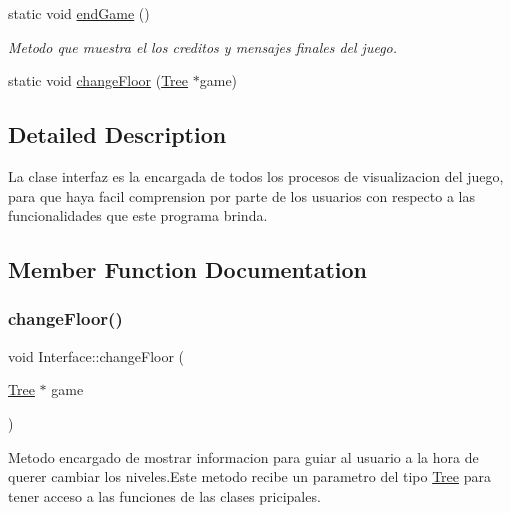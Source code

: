 \begin{DoxyCompactItemize}
\item 
\mbox{\label{class_interface_a242efa2cb3244d2955d5ed12e116f9b5}} 
static void \mbox{\hyperlink{class_interface_a242efa2cb3244d2955d5ed12e116f9b5}{end\+Game}} ()
\begin{DoxyCompactList}\small\item\em Metodo que muestra el los creditos y mensajes finales del juego. \end{DoxyCompactList}\item 
static void \mbox{\hyperlink{class_interface_a2f1cc2f4dbf8df5024708e55bb85c995}{change\+Floor}} (\mbox{\hyperlink{class_tree}{Tree}} $\ast$game)
\end{DoxyCompactItemize}


\subsection{Detailed Description}
La clase interfaz es la encargada de todos los procesos de visualizacion del juego, para que haya facil comprension por parte de los usuarios con respecto a las funcionalidades que este programa brinda. 

\subsection{Member Function Documentation}
\mbox{\label{class_interface_a2f1cc2f4dbf8df5024708e55bb85c995}} 
\subsubsection{\texorpdfstring{change\+Floor()}{changeFloor()}}
{\footnotesize\ttfamily void Interface\+::change\+Floor (\begin{DoxyParamCaption}\item[{\mbox{\hyperlink{class_tree}{Tree}} $\ast$}]{game }\end{DoxyParamCaption})\hspace{0.3cm}{\ttfamily [static]}}

Metodo encargado de mostrar informacion para guiar al usuario a la hora de querer cambiar los niveles.\+Este metodo recibe un parametro del tipo \mbox{\hyperlink{class_tree}{Tree}} para tener acceso a las funciones de las clases pricipales. \mbox{\label{class_interface_ae5610c5276f6839e66435b28547605c1}} 
